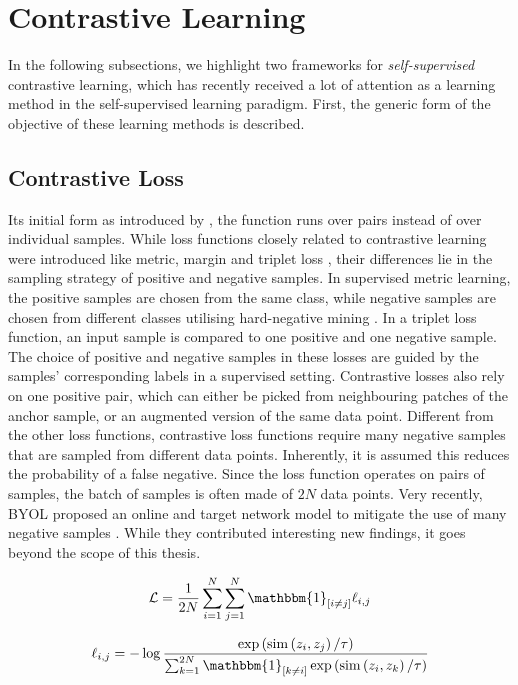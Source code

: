 \section{Contrastive Learning}
In the following subsections, we highlight two frameworks for \textit{self-supervised} contrastive learning, which has recently received a lot of attention as a learning method in the self-supervised learning paradigm. First, the generic form of the objective of these learning methods is described.


\subsection{Contrastive Loss}
Its initial form as introduced by \cite{contrastiveloss}, the function runs over pairs instead of over individual samples. While loss functions closely related to contrastive learning were introduced like metric, margin and triplet loss \cite{8014803, marginloss, chechik_large_2009}, their differences lie in the sampling strategy of positive and negative samples. In supervised metric learning, the positive samples are chosen from the same class, while negative samples are chosen from different classes utilising hard-negative mining \cite{8014803}. In a triplet loss function, an input sample is compared to one positive and one negative sample. The choice of positive and negative samples in these losses are guided by the samples' corresponding labels in a supervised setting. Contrastive losses also rely on one positive pair, which can either be picked from neighbouring patches of the anchor sample, or an augmented version of the same data point. Different from the other loss functions, contrastive loss functions require many negative samples that are sampled from different data points. Inherently, it is assumed this reduces the probability of a false negative. Since the loss function operates on pairs of samples, the batch of samples is often made of $2N$ data points. Very recently, BYOL proposed an online and target network model to mitigate the use of many negative samples \cite{Grill2020BootstrapYO}. While they contributed interesting new findings, it goes beyond the scope of this thesis.

\begin{equation}
    \mathcal{L} = \frac{1}{2N}\sum_{i=1}^{N}\sum_{j=1}^{N} \mathbbm{1}_{[i\neq j]}\ell_{i, j}
    \label{eq:total_loss_function}
\end{equation}


\begin{equation}
    \ell_{i, j}=-\log \frac{\exp \left(\operatorname{sim}\left(z_{i}, z_{j}\right) / \tau\right)}{\sum_{k=1}^{2 N} \mathbbm{1}_{[k \neq i]} \exp \left(\operatorname{sim}\left(z_{i}, z_{k}\right) / \tau\right)}
    \label{eq:loss_function}
\end{equation}

